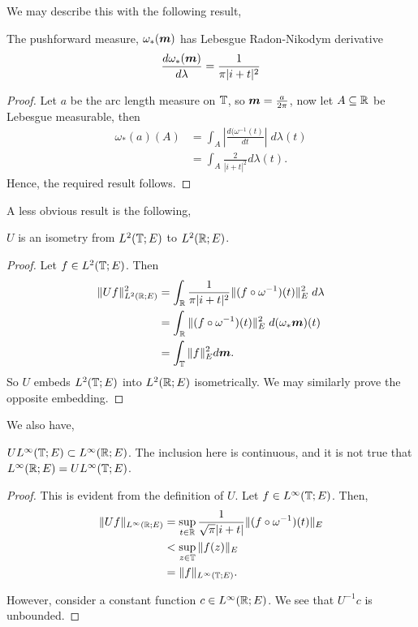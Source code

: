 We may describe this with the following result,
\begin{lemma}
    The pushforward measure, $\omega_*(\boldsymbol{m})$ has Lebesgue Radon-Nikodym 
    derivative
    \begin{equation*}
        \frac{d\omega_*(\boldsymbol{m})}{d\lambda} = \frac{1}{\pi|i+t|^2}
    \end{equation*}
\end{lemma}
\begin{proof}
    Let $a$ be the arc length measure on $\mathbb{T}$, so $\boldsymbol{m} = \frac{a}{2\pi}$, now
    let $A \subseteq \mathbb{R}$ be Lebesgue measurable, then
    \begin{align*}
        \omega_*(a)(A) &= \int_A \left|\frac{d(\omega^{-1}(t)}{dt}\right|\;d\lambda(t)\\
        &= \int_A \frac{2}{|i+t|^2}d\lambda(t).
    \end{align*}
    Hence, the required result follows.
\end{proof}


A less obvious result is the following, 
\begin{theorem}
    $U$ is an isometry from $L^2(\mathbb{T};E)$ to $L^2(\mathbb{R};E)$. 
\end{theorem}
\begin{proof}
    Let $f \in L^2(\mathbb{T};E)$. Then
    \begin{align*}
        \|U f\|_{L^2(\mathbb{R};E)}^2 &= \int_{\mathbb{R}} \frac{1}{\pi|i+t|^2}\|(f\circ\omega^{-1})(t)\|_E^2\;d\lambda\\
        &= \int_{\mathbb{R}} \|(f\circ\omega^{-1})(t)\|_E^2\;d(\omega_*\boldsymbol{m})(t)\\
        &= \int_{\mathbb{T}} \|f\|_E^2 d\boldsymbol{m}.
    \end{align*}
    So $U$ embeds $L^2(\mathbb{T};E)$ into $L^2(\mathbb{R};E)$ isometrically.
    We may similarly prove the opposite embedding.
\end{proof}


We also have,
\begin{theorem}
    $U L^\infty(\mathbb{T};E) \subset L^\infty(\mathbb{R};E)$. The inclusion
    here is continuous, and it is not true that $L^\infty(\mathbb{R};E) = U L^\infty(\mathbb{T};E)$.
\end{theorem}
\begin{proof}
    This is evident from the definition of $U$. Let $f \in L^\infty(\mathbb{T};E)$. Then,
    \begin{align*}
        \|U f\|_{L^\infty(\mathbb{R};E)} &= \sup_{t \in \mathbb{R}} \frac{1}{\sqrt{\pi}|i+t|}\|(f\circ \omega^{-1})(t)\|_{E} \\
        &< \sup_{z \in \mathbb{T}} \|f(z)\|_E\\
        &= \|f\|_{L^\infty(\mathbb{T};E)}.
    \end{align*}
    
    However, consider a constant function $c \in L^\infty(\mathbb{R};E)$.
    We see that $U^{-1}c$ is unbounded.
\end{proof}

